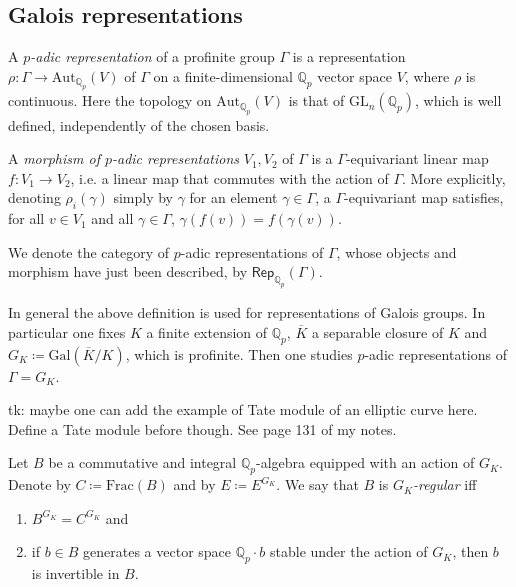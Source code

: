 \subsection{Galois representations}
\begin{defn}
	A {\em $p$-adic representation} of a profinite group $\Gamma$ is a
	representation $\rho\colon \Gamma \to \mathrm{Aut}_{\mathbb{Q}_p}(V)$
	of $\Gamma$ on a finite-dimensional $\mathbb{Q}_p$ vector space
	$V$, where $\rho$ is continuous.
	Here the topology on $\mathrm{Aut}_{\mathbb{Q}_p}(V)$ is
	that of $\mathrm{GL}_n(\mathbb{Q}_p)$, which is well defined,
	independently of the chosen basis.

	A {\em morphism of $p$-adic representations} $V_1, V_2$ of $\Gamma$
	is a $\Gamma$-equivariant linear map $f\colon V_1 \to V_2$, 
	i.e. a linear map that commutes with the action of $\Gamma$.
	More explicitly, denoting $\rho_i(\gamma)$ simply by $\gamma$ for
	an element $\gamma \in \Gamma$, a $\Gamma$-equivariant
	map satisfies, for all $v \in V_1$ and all $\gamma \in \Gamma$,
	$\gamma(f(v)) = f(\gamma(v))$.

	We denote the category of $p$-adic representations of $\Gamma$,
	whose objects and morphism have just been described,
	by $\mathsf{Rep}_{\mathbb{Q}_p}(\Gamma)$.
\end{defn}


\begin{rem}[]
	In general the above definition is used for representations of Galois groups.
	In particular one fixes $K$ a finite extension of $\mathbb{Q}_p$, $\overline{K}$
	a separable closure of $K$ and $G_K \coloneqq \mathrm{Gal}\left( \overline{K} / K \right)$,
	which is profinite.
	Then one studies $p$-adic representations of $\Gamma = G_K$.
\end{rem}


\begin{rem}[]
	tk: maybe one can add the example of Tate module of an elliptic curve here.
	Define a Tate module before though.
	See page 131 of my notes.
\end{rem}


\begin{defn}
	Let $B$ be a commutative and integral $\mathbb{Q}_p$-algebra
	equipped with an action of $G_K$.
	Denote by $C \coloneqq \mathrm{Frac}(B)$ and by $E \coloneqq E^{G_K}$.
	We say that $B$ is {\em $G_K$-regular} iff
\begin{enumerate}
	\item $B^{G_K} = C^{G_K}$ and
	\item if $b \in B$ generates a vector space $\mathbb{Q}_p \cdot b$
		stable under the action of $G_K$, then $b$ is invertible in $B$.
\end{enumerate}
\end{defn}


